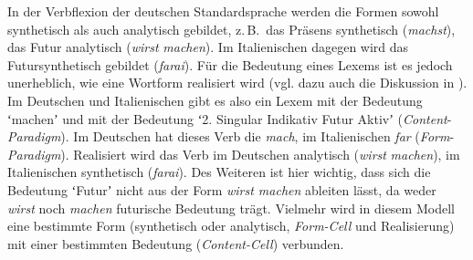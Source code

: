 In der Verbflexion der deutschen Standardsprache werden die Formen sowohl synthetisch als auch analytisch gebildet, z.\,B.\ das Präsens synthetisch (\textit{machst}), das Futur analytisch (\textit{wirst} \textit{machen}). Im Italienischen dagegen wird das Futur\pagebreak[4] synthetisch gebildet (\textit{farai}). Für die Bedeutung eines Lexems ist es jedoch unerheblich, wie eine Wortform realisiert wird (vgl. dazu auch die Diskussion in ). Im Deutschen und Italienischen gibt es also ein Lexem mit der Bedeutung ʻmachenʼ und mit der Bedeutung ʻ2. Singular Indikativ Futur Aktivʼ (\textit{Content}{}-\textit{Paradigm}). Im Deutschen hat dieses Verb die  \textit{mach}, im Italienischen \textit{far} (\textit{Form}{}-\textit{Paradigm}). Realisiert wird das Verb im Deutschen analytisch (\textit{wirst} \textit{machen}), im Italienischen synthetisch (\textit{farai}). Des Weiteren ist hier wichtig, dass sich die Bedeutung ʻFuturʼ nicht aus der Form \textit{wirst machen} ableiten lässt, da weder \textit{wirst} noch \textit{machen} futurische Bedeutung trägt. Vielmehr wird in diesem Modell eine bestimmte Form (synthetisch oder analytisch, \textit{Form-Cell} und Realisierung) mit einer bestimmten Bedeutung (\textit{Content-Cell}) verbunden.


